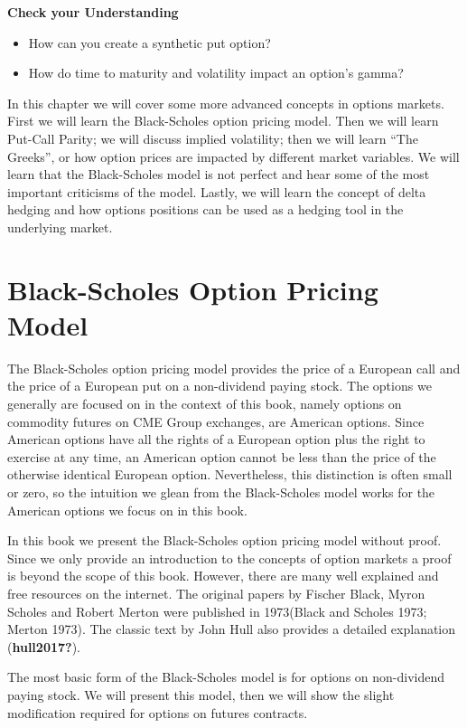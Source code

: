 \documentclass[
  letterpaper,
  DIV=11,
  numbers=noendperiod]{scrreprt}
\begin{document}
\textbf{Check your Understanding}

\begin{itemize}
\item
  How can you create a synthetic put option?
\item
  How do time to maturity and volatility impact an option's gamma?
\end{itemize}

In this chapter we will cover some more advanced concepts in options
markets. First we will learn the Black-Scholes option pricing model.
Then we will learn Put-Call Parity; we will discuss implied volatility;
then we will learn ``The Greeks'', or how option prices are impacted by
different market variables. We will learn that the Black-Scholes model
is not perfect and hear some of the most important criticisms of the
model. Lastly, we will learn the concept of delta hedging and how
options positions can be used as a hedging tool in the underlying
market.

\hypertarget{black-scholes-option-pricing-model}{%
\section{Black-Scholes Option Pricing
Model}\label{black-scholes-option-pricing-model}}

The Black-Scholes option pricing model provides the price of a European
call and the price of a European put on a non-dividend paying stock. The
options we generally are focused on in the context of this book, namely
options on commodity futures on CME Group exchanges, are American
options. Since American options have all the rights of a European option
plus the right to exercise at any time, an American option cannot be
less than the price of the otherwise identical European option.
Nevertheless, this distinction is often small or zero, so the intuition
we glean from the Black-Scholes model works for the American options we
focus on in this book.

In this book we present the Black-Scholes option pricing model without
proof. Since we only provide an introduction to the concepts of option
markets a proof is beyond the scope of this book. However, there are
many well explained and free resources on the internet. The original
papers by Fischer Black, Myron Scholes and Robert Merton were published
in 1973(Black and Scholes 1973; Merton 1973). The classic text by John
Hull also provides a detailed explanation (\textbf{hull2017?}).

The most basic form of the Black-Scholes model is for options on
non-dividend paying stock. We will present this model, then we will show
the slight modification required for options on futures contracts.
\end{document}

